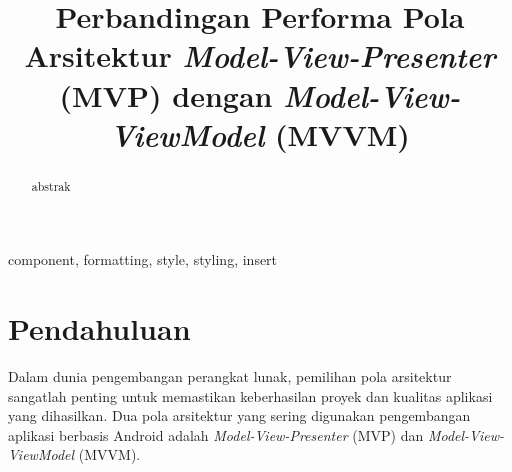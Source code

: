 \documentclass[conference]{IEEEtran}
\begin{document}
	
	\title{Perbandingan Performa Pola Arsitektur \textit{Model-View-Presenter} (MVP) dengan \textit{Model-View-ViewModel} (MVVM)\\
	}
	
	\author{
		\and
		\and
		\and
	}
	
	\maketitle
	
	\begin{abstract}
		abstrak
	\end{abstract}
	
	\begin{IEEEkeywords}
		component, formatting, style, styling, insert
	\end{IEEEkeywords}
	
	\section{Pendahuluan}
	Dalam dunia pengembangan perangkat lunak, pemilihan pola arsitektur sangatlah penting untuk memastikan keberhasilan proyek dan kualitas aplikasi yang dihasilkan. Dua pola arsitektur yang sering digunakan pengembangan aplikasi berbasis Android adalah \textit{Model-View-Presenter} (MVP) dan \textit{Model-View-ViewModel} (MVVM). 
	
\end{document}
